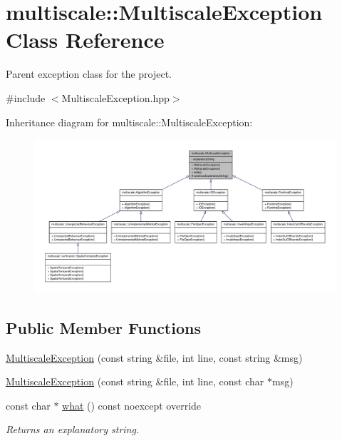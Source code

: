 \hypertarget{classmultiscale_1_1MultiscaleException}{\section{multiscale\-:\-:\-Multiscale\-Exception \-Class \-Reference}
\label{classmultiscale_1_1MultiscaleException}
}


\-Parent exception class for the project.  




{\ttfamily \#include $<$\-Multiscale\-Exception.\-hpp$>$}



\-Inheritance diagram for multiscale\-:\-:\-Multiscale\-Exception\-:
\nopagebreak
\begin{figure}[H]
\begin{center}
\leavevmode
\includegraphics[width=350pt]{classmultiscale_1_1MultiscaleException__inherit__graph}
\end{center}
\end{figure}
\subsection*{\-Public \-Member \-Functions}
\begin{DoxyCompactItemize}
\item 
\hyperlink{classmultiscale_1_1MultiscaleException_a6eb7d129f239cc1c4f497b1bbaf94fa5}{\-Multiscale\-Exception} (const string \&file, int line, const string \&msg)
\item 
\hyperlink{classmultiscale_1_1MultiscaleException_a3c0023538ce22fcd663b98a39b12d5a5}{\-Multiscale\-Exception} (const string \&file, int line, const char $\ast$msg)
\item 
const char $\ast$ \hyperlink{classmultiscale_1_1MultiscaleException_a1af231f6e68715087f5be6e4000e8409}{what} () const noexcept override
\begin{DoxyCompactList}\small\item\em \-Returns an explanatory string. \end{DoxyCompactList}\end{DoxyCompactItemize}
